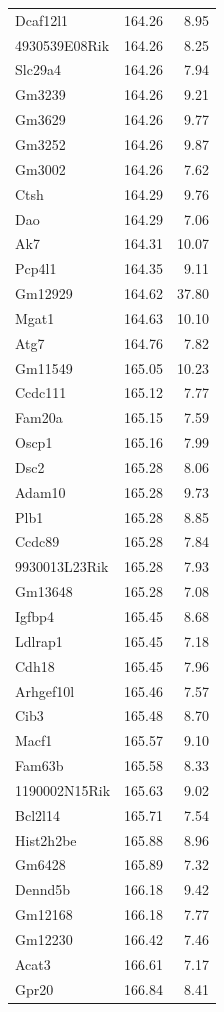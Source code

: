 \documentclass{article}
\begin{document}
\begin{longtable}{lrr}
  Dcaf12l1 & 164.26 & 8.95 \\ 
  4930539E08Rik & 164.26 & 8.25 \\ 
  Slc29a4 & 164.26 & 7.94 \\ 
  Gm3239 & 164.26 & 9.21 \\ 
  Gm3629 & 164.26 & 9.77 \\ 
  Gm3252 & 164.26 & 9.87 \\ 
  Gm3002 & 164.26 & 7.62 \\ 
  Ctsh & 164.29 & 9.76 \\ 
  Dao & 164.29 & 7.06 \\ 
  Ak7 & 164.31 & 10.07 \\ 
  Pcp4l1 & 164.35 & 9.11 \\ 
  Gm12929 & 164.62 & 37.80 \\ 
  Mgat1 & 164.63 & 10.10 \\ 
  Atg7 & 164.76 & 7.82 \\ 
  Gm11549 & 165.05 & 10.23 \\ 
  Ccdc111 & 165.12 & 7.77 \\ 
  Fam20a & 165.15 & 7.59 \\ 
  Oscp1 & 165.16 & 7.99 \\ 
  Dsc2 & 165.28 & 8.06 \\ 
  Adam10 & 165.28 & 9.73 \\ 
  Plb1 & 165.28 & 8.85 \\ 
  Ccdc89 & 165.28 & 7.84 \\ 
  9930013L23Rik & 165.28 & 7.93 \\ 
  Gm13648 & 165.28 & 7.08 \\ 
  Igfbp4 & 165.45 & 8.68 \\ 
  Ldlrap1 & 165.45 & 7.18 \\ 
  Cdh18 & 165.45 & 7.96 \\ 
  Arhgef10l & 165.46 & 7.57 \\ 
  Cib3 & 165.48 & 8.70 \\ 
  Macf1 & 165.57 & 9.10 \\ 
  Fam63b & 165.58 & 8.33 \\ 
  1190002N15Rik & 165.63 & 9.02 \\ 
  Bcl2l14 & 165.71 & 7.54 \\ 
  Hist2h2be & 165.88 & 8.96 \\ 
  Gm6428 & 165.89 & 7.32 \\ 
  Dennd5b & 166.18 & 9.42 \\ 
  Gm12168 & 166.18 & 7.77 \\ 
  Gm12230 & 166.42 & 7.46 \\ 
  Acat3 & 166.61 & 7.17 \\ 
  Gpr20 & 166.84 & 8.41 \\ 
   \hline
\end{longtable}
\end{document}
